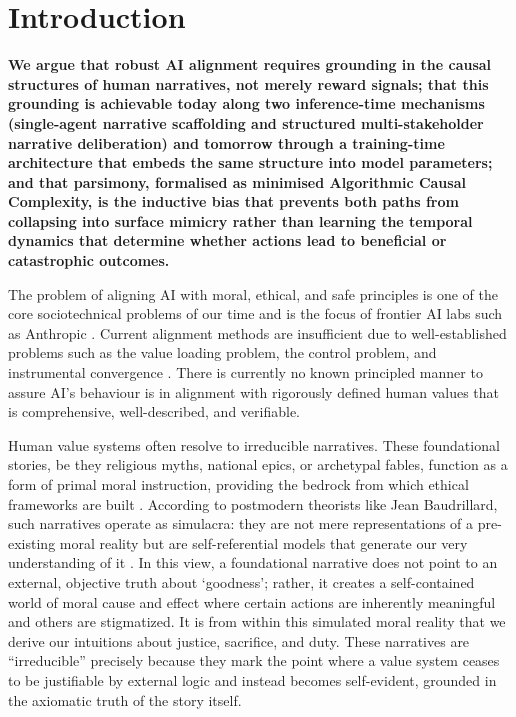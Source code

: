 \documentclass{article}
\theoremstyle{plain}
\theoremstyle{definition}
\theoremstyle{remark}
\begin{document}
\section{Introduction}

\textbf{We argue that robust AI alignment requires grounding in the causal structures of human narratives, not merely reward signals; that this grounding is achievable today along two inference-time mechanisms (single-agent narrative scaffolding and structured multi-stakeholder narrative deliberation) and tomorrow through a training-time architecture that embeds the same structure into model parameters; and that parsimony, formalised as minimised Algorithmic Causal Complexity, is the inductive bias that prevents both paths from collapsing into surface mimicry rather than learning the temporal dynamics that determine whether actions lead to beneficial or catastrophic outcomes.}

The problem of aligning AI with moral, ethical, and safe principles is one of the core sociotechnical problems of our time and is the focus of frontier AI labs such as Anthropic \citep{anthropic23}. Current alignment methods are insufficient due to well-established problems such as the value loading problem, the control problem, and instrumental convergence \citep{ji23}. There is currently no known principled manner to assure AI's behaviour is in alignment with rigorously defined human values that is comprehensive, well-described, and verifiable.

Human value systems often resolve to irreducible narratives. These foundational stories, be they religious myths, national epics, or archetypal fables, function as a form of primal moral instruction, providing the bedrock from which ethical frameworks are built \citep{macintyre81, bruner86}. According to postmodern theorists like Jean Baudrillard, such narratives operate as simulacra: they are not mere representations of a pre-existing moral reality but are self-referential models that generate our very understanding of it \citep{baudrillard94}. In this view, a foundational narrative does not point to an external, objective truth about `goodness'; rather, it creates a self-contained world of moral cause and effect where certain actions are inherently meaningful and others are stigmatized. It is from within this simulated moral reality that we derive our intuitions about justice, sacrifice, and duty. These narratives are ``irreducible'' precisely because they mark the point where a value system ceases to be justifiable by external logic and instead becomes self-evident, grounded in the axiomatic truth of the story itself.
\end{document}
